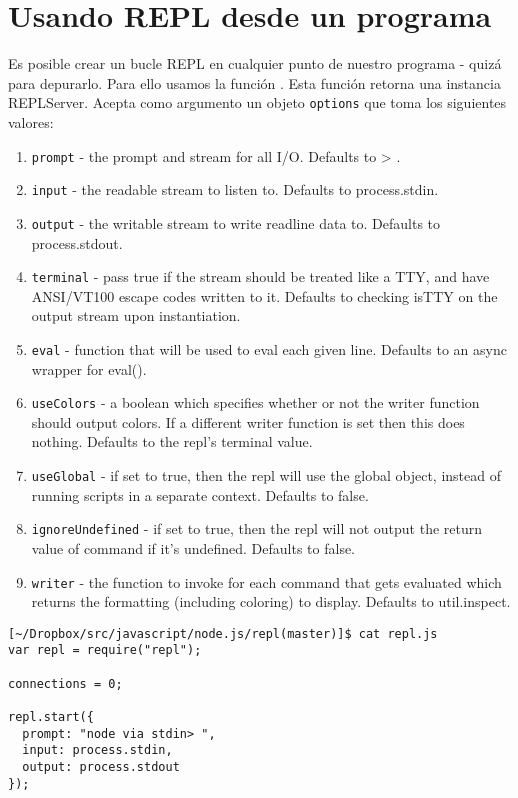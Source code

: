 \section{Usando REPL desde un programa}

Es posible crear un bucle REPL en cualquier punto de nuestro programa - quizá para depurarlo.
Para ello usamos la función 
.
Esta función retorna una instancia REPLServer. Acepta como argumento un objeto
\verb"options" que toma los siguientes valores:

\begin{enumerate}
\item \verb|prompt| - the prompt and stream for all I/O. Defaults to > .
\item \verb|input| - the readable stream to listen to. Defaults to process.stdin.
\item \verb|output| - the writable stream to write readline data to. Defaults to process.stdout.
\item \verb|terminal| - pass true if the stream should be treated
like a TTY, and have ANSI/VT100 escape codes written to it. Defaults
to checking isTTY on the output stream upon instantiation.
\item \verb|eval| - function that will be used to eval each given
line. Defaults to an async wrapper for eval(). 
\item \verb|useColors| - a boolean which specifies whether or not
the writer function should output colors. If a different writer
function is set then this does nothing. Defaults to the repl's
terminal value.
\item \verb|useGlobal| - if set to true, then the repl will use the
global object, instead of running scripts in a separate context.
Defaults to false.
\item \verb|ignoreUndefined| - if set to true, then the repl will
not output the return value of command if it's undefined. Defaults
to false.
\item \verb|writer| - the function to invoke for each command that
gets evaluated which returns the formatting (including coloring)
to display. Defaults to util.inspect.
\end{enumerate}

\begin{verbatim}
[~/Dropbox/src/javascript/node.js/repl(master)]$ cat repl.js 
var repl = require("repl");

connections = 0;

repl.start({
  prompt: "node via stdin> ",
  input: process.stdin,
  output: process.stdout
});
\end{verbatim}

